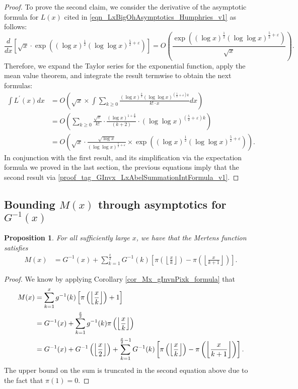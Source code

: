 \documentclass[11pt,reqno,a4letter]{article}
\numberwithin{figure}{section}
\numberwithin{table}{section}
\newcommand{\Floor}[2]{\ensuremath{\left\lfloor \frac{#1}{#2} \right\rfloor}}
\theoremstyle{plain}
\newtheorem{prop}[theorem]{Proposition}
\numberwithin{theorem}{section}
\theoremstyle{definition}
\begin{document}
\begin{proof}
To prove the second claim, we consider the derivative of the asymptotic formula for $L(x)$ 
cited in \eqref{eqn_LxBigOhAsymptotics_Humphries_v1} as follows: 
\[
\frac{d}{dx}\left[\sqrt{x} \cdot \exp\left( (\log x)^{\frac{1}{2}} 
     (\log\log x)^{\frac{5}{2} + \varepsilon}\right)\right] = 
     O\left(\frac{\exp\left( (\log x)^{\frac{1}{2}} 
     (\log\log x)^{\frac{5}{2} + \varepsilon}\right)}{\sqrt{x}} 
     \right).
\]
Therefore, we expand the Taylor series for the exponential function, apply the 
mean value theorem, and integrate the result termwise to obtain the next formulas: 
\begin{align*} 
\int L^{\prime}(x) dx & = O\left(\sqrt{x} \times \int \sum_{k \geq 0} 
     \frac{(\log x)^{\frac{k}{2}} (\log\log x)^{\left(\frac{5}{2} + \varepsilon\right)k}}{k! \cdot x} dx 
     \right) \\ 
     & = O\left(\sum_{k \geq 0} \frac{\sqrt{x}}{k!} \cdot 
     \frac{(\log x)^{1+\frac{k}{2}}}{(k+2)} \cdot 
     (\log\log x)^{\left(\frac{5}{2}+\varepsilon\right)k}\right) \\ 
     & = O\left(\sqrt{x} \cdot \frac{\sqrt{\log x}}{(\log\log x)^{\frac{5}{2}+\varepsilon}} \times 
     \exp\left( (\log x)^{\frac{1}{2}} 
     (\log\log x)^{\frac{5}{2} + \varepsilon}\right)
     \right). 
\end{align*} 
In conjunction with the first result, and its simplification via the expectation formula 
we proved in the last section, the previous equations imply that 
the second result via \eqref{proof_tag_GInvx_LxAbelSummationIntFormula_v1}. 
\end{proof} 

\subsection{Bounding $M(x)$ through asymptotics for $G^{-1}(x)$} 

\begin{prop} 
\label{prop_Mx_SBP_IntegralFormula} 
For all sufficiently large $x$, we have that the Mertens function satisfies 
\begin{align} 
\label{eqn_pf_tag_v2-restated_v2} 
M(x) & = G^{-1}(x) + 
     \sum_{k=1}^{\frac{x}{2}} G^{-1}(k) \left[ 
     \pi\left(\Floor{x}{k}\right) - \pi\left(\Floor{x}{k+1}\right) 
     \right]. 
\end{align} 
\end{prop} 
\begin{proof} 
We know by applying Corollary \ref{cor_Mx_gInvnPixk_formula} that 
\begin{align} 
\notag
M(x) & = \sum_{k=1}^{x} g^{-1}(k) \left[\pi\left(\Floor{x}{k}\right)+1\right] \\ 
\notag 
     & = G^{-1}(x) + \sum_{k=1}^{\frac{x}{2}} g^{-1}(k) \pi\left(\Floor{x}{k}\right) \\ 
\notag 
     & = G^{-1}(x) + G^{-1}\left(\Floor{x}{2}\right) + 
     \sum_{k=1}^{\frac{x}{2}-1} G^{-1}(k) \left[ 
     \pi\left(\Floor{x}{k}\right) - \pi\left(\Floor{x}{k+1}\right) 
     \right].
\end{align} 
The upper bound on the sum is truncated in the second equation 
above due to the fact that $\pi(1) = 0$. 
\end{proof} 
\end{document}
